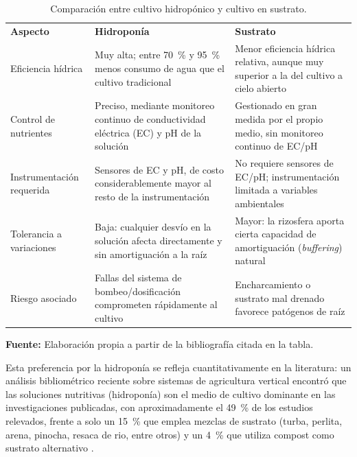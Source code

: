 \begin{table}[htbp]
\centering
\small %
\begin{tabularx}{\textwidth}{@{} X p{5.5cm} p{5.5cm} @{}}
\textbf{Aspecto} & \textbf{Hidroponía} & \textbf{Sustrato} \\
Eficiencia hídrica & Muy alta; entre \qty{70}{\percent} y \qty{95}{\percent} menos consumo de agua que el cultivo tradicional \cite{barbosa2015comparison} & Menor eficiencia hídrica relativa, aunque muy superior a la del cultivo a cielo abierto \\ \addlinespace

Control de nutrientes & Preciso, mediante monitoreo continuo de conductividad eléctrica (EC) y pH de la solución \cite{savvas2018application} & Gestionado en gran medida por el propio medio, sin monitoreo continuo de EC/pH \\ \addlinespace

Instrumentación requerida & Sensores de EC y pH, de costo considerablemente mayor al resto de la instrumentación & No requiere sensores de EC/pH; instrumentación limitada a variables ambientales \\ \addlinespace

Tolerancia a variaciones & Baja: cualquier desvío en la solución afecta directamente y sin amortiguación a la raíz & Mayor: la rizosfera aporta cierta capacidad de amortiguación (\textit{buffering}) natural \cite{savvas2018application} \\ \addlinespace

Riesgo asociado & Fallas del sistema de bombeo/dosificación comprometen rápidamente al cultivo & Encharcamiento o sustrato mal drenado favorece patógenos de raíz \cite{savvas2018application} \\
\end{tabularx}

\caption{Comparación entre cultivo hidropónico y cultivo en sustrato.}
\label{tab:sustrato_vs_hidroponia}
\vspace{1mm}
{\footnotesize \textbf{Fuente:} Elaboración propia a partir de la bibliografía citada en la tabla.}
\end{table}

Esta preferencia por la hidroponía se refleja cuantitativamente en la literatura: un análisis bibliométrico reciente sobre sistemas de agricultura vertical encontró que las soluciones nutritivas (hidroponía) son el medio de cultivo dominante en las investigaciones publicadas, con aproximadamente el \SI{49}{\percent} de los estudios relevados, frente a solo un \SI{15}{\percent} que emplea mezclas de sustrato (turba, perlita, arena, pinocha, resaca de rio, entre otros) y un \SI{4}{\percent} que utiliza compost como sustrato alternativo \cite{najera2023}.


